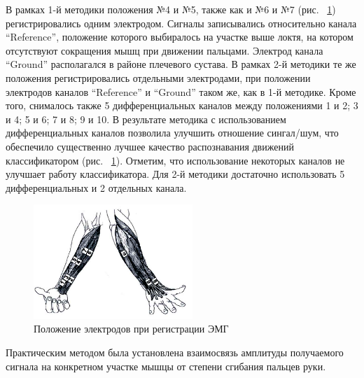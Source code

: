 \documentclass[10pt, a5paper]{article}
\begin{document}
В рамках 1-й методики положения №4 и №5, также как и №6 и №7 (рис. ~\ref{Shamonin2}) регистрировались одним электродом. Сигналы записывались относительно канала “Reference”, положение которого выбиралось на участке выше локтя, на котором отсутствуют сокращения мышц при движении пальцами. Электрод канала “Ground” располагался в районе плечевого сустава. В рамках 2-й методики те же положения регистрировались отдельными электродами, при положении электродов каналов “Reference” и “Ground” таком же, как в 1-й методике. Кроме того, снималось также 5 дифференциальных каналов между положениями 1 и 2; 3 и 4; 5 и 6; 7 и 8; 9 и 10. В результате методика с использованием дифференциальных каналов позволила улучшить отношение сингал/шум, что обеспечило существенно лучшее качество распознавания движений классификатором (рис. ~\ref{Shamonin2}). Отметим, что использование некоторых каналов не улучшает работу классификатора. Для 2-й методики достаточно использовать 5 дифференциальных и 2 отдельных канала.

\begin{center}
\begin{figure}[h!]
  \centering
  \includegraphics[width=6cm]{Shamonin2.png}
  \caption{Положение электродов при регистрации ЭМГ}
  \label{Shamonin2}

\end{figure}

\end{center}

Практическим методом была установлена взаимосвязь амплитуды получаемого сигнала на конкретном участке мышцы от степени сгибания пальцев руки.
\end{document}
